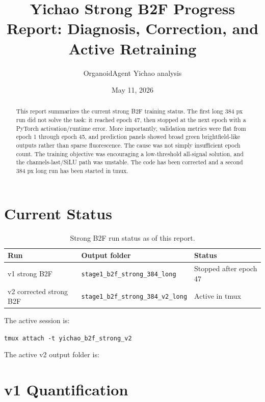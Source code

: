 \documentclass[11pt]{article}
\title{\textbf{Yichao Strong B2F Progress Report: Diagnosis, Correction, and Active Retraining}}
\author{OrganoidAgent Yichao analysis}
\date{May 11, 2026}
\begin{document}
\maketitle

\begin{abstract}
This report summarizes the current strong B2F training status. The first long 384 px run did not solve the task: it reached epoch 47, then stopped at the next epoch with a PyTorch activation/runtime error. More importantly, validation metrics were flat from epoch 1 through epoch 45, and prediction panels showed broad green brightfield-like outputs rather than sparse fluorescence. The cause was not simply insufficient epoch count. The training objective was encouraging a low-threshold all-signal solution, and the channels-last/SiLU path was unstable. The code has been corrected and a second 384 px long run has been started in tmux.
\end{abstract}

\section{Current Status}

\begin{table}[H]
\centering
\caption{Strong B2F run status as of this report.}
\begin{tabular}{lll}
\toprule
Run & Output folder & Status \\
\midrule
v1 strong B2F & \texttt{stage1\_b2f\_strong\_384\_long} & Stopped after epoch 47 \\
v2 corrected strong B2F & \texttt{stage1\_b2f\_strong\_384\_v2\_long} & Active in tmux \\
\bottomrule
\end{tabular}
\end{table}

The active session is:

\begin{center}
\small
\texttt{tmux attach -t yichao\_b2f\_strong\_v2}
\end{center}

The active v2 output folder is:

\begin{center}
\small
{}
\end{center}

\section{v1 Quantification}
\end{document}
